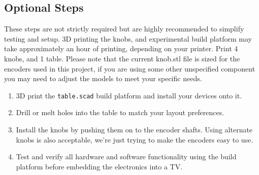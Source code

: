 \documentclass[]{article}
\begin{document}
\subsection*{Optional Steps}

These steps are not strictly required but are highly recommended to simplify testing and setup. 3D printing the knobs, and experimental build platform may take approximately an hour of printing, depending on your printer. Print 4 knobs, and 1 table. Please note that the current knob.stl file is sized for the encoders used in this project, if you are using some other unspecified component you may need to adjust the models to meet your specific needs. 

\begin{enumerate}
	\item 3D print the \texttt{table.scad} build platform and install your devices onto it.
	\item Drill or melt holes into the table  to match your layout preferences. 
	\item Install the knobs by pushing them on to the encoder shafts. Using alternate knobs is also acceptable, we're just trying to make the encoders easy to use.
	\item Test and verify all hardware and software functionality using the build platform before embedding the electronics into a TV.
\end{enumerate}
\end{document}
